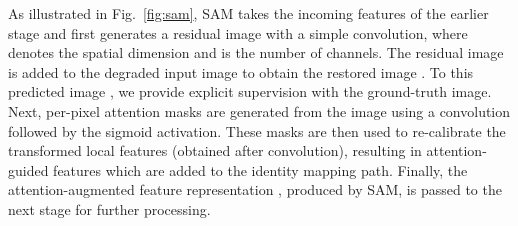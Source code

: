 \documentclass[10pt,twocolumn,letterpaper]{article}
\begin{document}
As illustrated in Fig.~\ref{fig:sam}, SAM takes the incoming features  of the earlier stage and first generates a residual image  with a simple  convolution, where  denotes the spatial dimension and  is the number of channels. 
The residual image is added to the degraded input image  to obtain the restored image .
To this predicted image , we provide explicit supervision with the ground-truth image. 
Next, per-pixel attention masks  are generated from the image  using a  convolution followed by the sigmoid activation. 
These masks are then used to re-calibrate the transformed local features  (obtained after  convolution), resulting in attention-guided features which are added to the identity mapping path. 
Finally, the attention-augmented feature representation , produced by SAM, is passed to the next stage for further processing. 



\begin{table*}[!t]
\begin{center}
\caption{\small Dataset description for various image restoration tasks.}
\label{table:datasets}
\vspace{-2mm}
\setlength{\tabcolsep}{0.8pt}
\end{center}\vspace{-1.5em}
\end{table*}
\end{document}
